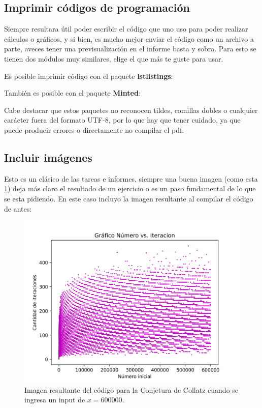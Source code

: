 \documentclass[11pt,letterpaper]{article}
\begin{document}
\subsection*{Imprimir códigos de programación}
Siempre resultara útil poder escribir el código que uno uso para poder realizar cálculos o gráficos, y si bien, es mucho mejor enviar el código como un archivo a parte, aveces tener una previsualización en el informe basta y sobra. Para esto se tienen dos módulos muy similares, elige el que más te guste para usar.\par
Es posible imprimir código con el paquete \textbf{lstlistings}:

También es posible con el paquete \textbf{Minted}:


Cabe destacar que estos paquetes no reconocen tildes, comillas dobles o cualquier carácter fuera del formato UTF-8, por lo que hay que tener cuidado, ya que puede producir errores o directamente no compilar el pdf.
\subsection*{Incluir imágenes}

Esto es un clásico de las tareas e informes, siempre una buena imagen (como esta \ref{code1}) deja más claro el resultado de un ejercicio o es un paso fundamental de lo que se esta pidiendo. En este caso incluyo la imagen resultante al compilar el código de antes:
\begin{figure}[H]
        \centering
        \includegraphics[]{foto.png}
        \caption{Imagen resultante del código para la Conjetura de Collatz cuando se ingresa un input de $x=600000$.}
        \label{code1}
\end{figure}
\end{document}
